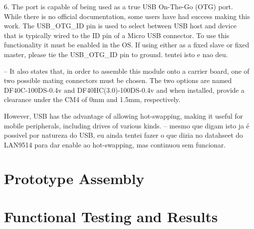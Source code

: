     6. The port is capable of being used as a true USB On-The-Go (OTG) port. While there is no official documentation, some users have had success making this work. The USB\_OTG\_ID pin is used to select between USB host and device that is typically wired to the ID pin of a Micro USB connector. To use this functionality it must be enabled in the OS. If using either as a fixed slave or fixed master, please tie the USB\_OTG\_ID pin to ground. tentei isto e nao deu.

	-- It also states that, in order to assemble this module onto a carrier board, one of two possible mating connectors must be chosen. The two options are named DF40C-100DS-0.4v and DF40HC(3.0)-100DS-0.4v and when installed, provide a clearance under the CM4 of 0mm and 1.5mm, respectively. 

    However, USB has the advantage of allowing hot-swapping, making it useful for mobile peripherals, including drives of various kinds. -- mesmo que digam isto ja é possivel por natureza do USB, eu ainda tentei fazer o que dizia no datahseet do LAN9514 para dar enable ao hot-swapping, mas continuou sem funcionar.

\section{Prototype Assembly}\label{sec:53_PrototypeAssembly}

\section{Functional Testing and Results}\label{sec:54_FunctionalTesting}